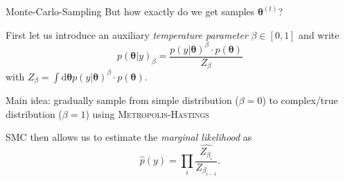\documentclass[11pt,aspectratio=1610,dvipsnames]{beamer}
\newcommand{\btheta}{\boldsymbol{\theta}}
\begin{document}
\begin{frame}{Monte-Carlo-Sampling}
	But how exactly do we get samples $\btheta^{(t)}$?
			\begin{tcolorbox}[colback=black!5,colframe=gray!15!black,title={Sequential Monte Carlo (SMC)}]
				First let us introduce an auxiliary \emph{temperature parameter} $\beta\in [0,1]$ and write
				\begin{equation}
					p(\btheta|y)_\beta=\frac{p(y|\btheta)^\beta\cdot p(\btheta)}{Z_\beta}
				\end{equation}
			with $Z_\beta=\int\text{d}\btheta p(y|\btheta)^\beta\cdot p(\btheta)$.
				
				Main idea: gradually sample from simple distribution ($\beta=0$) to complex/true distribution ($\beta=1$) using \textsc{Metropolis-Hastings}
				
				SMC then allows us to estimate the \emph{marginal likelihood} as 
				\begin{equation}\label{eq:with_the_hat}
				\hat{p}(y)=\prod_{i}\widehat{\frac{Z_{\beta_i}}{Z_{\beta_{i-1}}}}.
				\end{equation}
				\raggedleft
				\small\citet{SMC_PEPE,PyMC3_SMC}
		\end{tcolorbox}
	
\end{frame}
\end{document}
